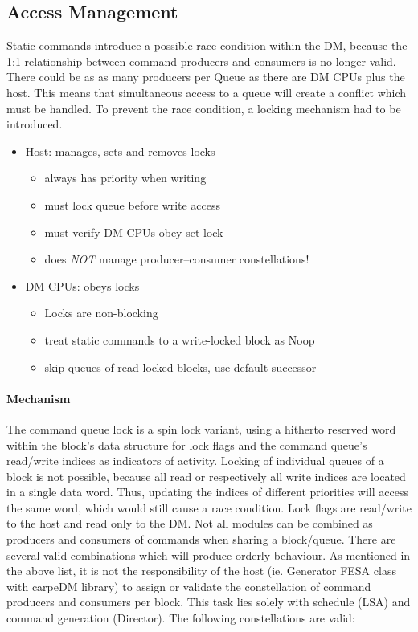 \subsection{Access Management}
\label{ssec:locks}
Static commands introduce a possible race condition within the DM, because the 1:1 relationship between command producers and consumers is no longer valid. There could be as as many producers per Queue as there are DM CPUs plus the host. This means that simultaneous access to a queue will create a conflict which must be handled. To prevent the race condition, a locking mechanism had to be introduced.
\begin{itemize}
  \item{Host: manages, sets and removes locks}
  \begin{itemize}
    \item{always has priority when writing}
    \item{must lock queue before write access}
    \item{must verify DM CPUs obey set lock}
    \item{does \emph{NOT} manage producer--consumer constellations!}
  \end{itemize}
  \item{DM CPUs: obeys locks}
  \begin{itemize}
   \item{Locks are non-blocking}
   \item{treat static commands to a write-locked block as Noop} 
   \item{skip queues of read-locked blocks, use default successor}
  \end{itemize}
\end{itemize}







\paragraph{Mechanism}
The command queue lock is a spin lock variant, using a hitherto reserved word within the block's data structure for lock flags and the command queue's read/write indices as indicators of activity. 
Locking of individual queues of a block is not possible, because all read or respectively all write indices are located in a single data word. Thus, updating the indices of different priorities will access the same word, which would still cause a race condition. Lock flags are read/write to the host and read only to the DM. 
Not all modules can be combined as producers and consumers of commands when sharing a block/queue. There are several valid combinations which will produce orderly behaviour.
As mentioned in the above list, it is not the responsibility of the host (ie. Generator FESA class with carpeDM library)
to assign or validate the constellation of command producers and consumers per block. This task lies solely with schedule (LSA) and command generation (Director). The following constellations are valid:


